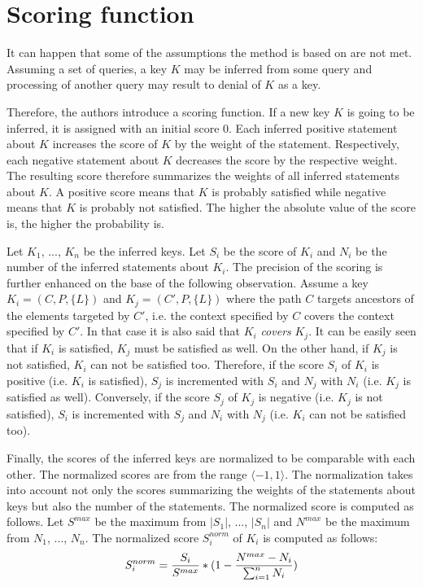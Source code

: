 \section{Scoring function}
It can happen that some of the assumptions the method is based on are not met. Assuming a set of queries, a key $K$ may be inferred from some query and processing of another query may result to denial of $K$ as a key. 

Therefore, the authors introduce a scoring function. If a new key $K$ is going to be inferred, it is assigned with an initial score 0. Each inferred positive statement about $K$ increases the score of $K$ by the weight of the statement. Respectively, each negative statement about $K$ decreases the score by the respective weight. The resulting score therefore summarizes the weights of all inferred statements about $K$. A positive score means that $K$ is probably satisfied while negative means that $K$ is probably not satisfied. The higher the absolute value of the score is, the higher the probability is.

Let $K_1$, ..., $K_n$ be the inferred keys. Let $S_i$ be the score of $K_i$ and $N_i$ be the number of the inferred statements about $K_i$. The precision of the scoring is further enhanced on the base of the following observation. Assume a key $K_i = (C, P, \{L\})$ and $K_j = (C' , P, \{L\})$ where the path $C$ targets ancestors of the elements targeted by $C'$, i.e. the context specified by $C$ covers the context specified by $C'$. In that case it is also said that $K_i$ \emph{covers} $K_j$. It can be easily seen that if $K_i$ is satisfied, $K_j$ must be satisfied as well. On the other hand, if $K_j$ is not satisfied, $K_i$ can not be satisfied too. Therefore, if the score $S_i$ of $K_i$ is positive (i.e. $K_i$ is satisfied), $S_j$ is incremented with $S_i$ and $N_j$ with $N_i$ (i.e. $K_j$ is satisfied as well). Conversely, if the score $S_j$ of $K_j$ is negative (i.e. $K_j$ is not satisfied), $S_i$ is incremented with $S_j$ and $N_i$ with $N_j$ (i.e. $K_i$ can not be satisfied too).

Finally, the scores of the inferred keys are normalized to be comparable with each other. The normalized scores are from the range $\langle -1, 1\rangle$. The normalization takes into account not only the scores summarizing the weights of the statements about keys but also the number of the statements. The normalized score is computed as follows. Let $S^{max}$ be the maximum from $|S_1|$, ..., $|S_n|$ and $N^{max}$ be the maximum from $N_1$, ..., $N_n$. The normalized score $S_i^{norm}$ of $K_i$ is computed as follows:
$$S_i^{norm} = {S_i \over S^{max}} * (1 - {N^{max} - N_i \over \sum _{i=1}^n N_i})$$

